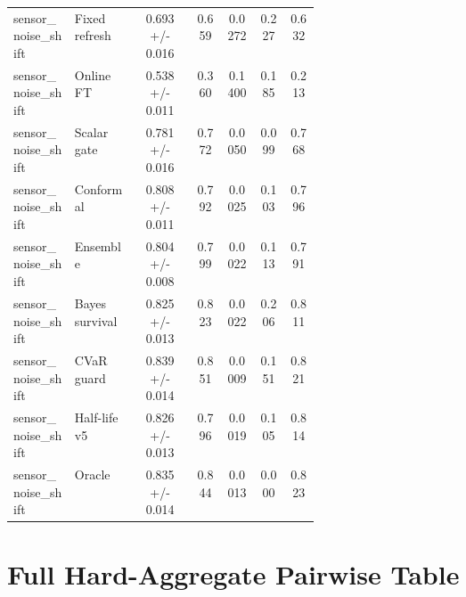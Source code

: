 \documentclass{article}
\begin{document}
\begin{center}
\begin{longtable}{p{0.20\linewidth}p{0.20\linewidth}ccccc}
sensor\_noise\_shift & Fixed refresh & 0.693 +/- 0.016 & 0.659 & 0.0272 & 0.227 & 0.632\\
sensor\_noise\_shift & Online FT & 0.538 +/- 0.011 & 0.360 & 0.1400 & 0.185 & 0.213\\
sensor\_noise\_shift & Scalar gate & 0.781 +/- 0.016 & 0.772 & 0.0050 & 0.099 & 0.768\\
sensor\_noise\_shift & Conformal & 0.808 +/- 0.011 & 0.792 & 0.0025 & 0.103 & 0.796\\
sensor\_noise\_shift & Ensemble & 0.804 +/- 0.008 & 0.799 & 0.0022 & 0.113 & 0.791\\
sensor\_noise\_shift & Bayes survival & 0.825 +/- 0.013 & 0.823 & 0.0022 & 0.206 & 0.811\\
sensor\_noise\_shift & CVaR guard & 0.839 +/- 0.014 & 0.851 & 0.0009 & 0.151 & 0.821\\
sensor\_noise\_shift & Half-life v5 & 0.826 +/- 0.013 & 0.796 & 0.0019 & 0.105 & 0.814\\
sensor\_noise\_shift & Oracle & 0.835 +/- 0.014 & 0.844 & 0.0013 & 0.000 & 0.823\\
\bottomrule
\end{longtable}
\normalsize
\end{center}

\section{Full Hard-Aggregate Pairwise Table}
\end{document}
